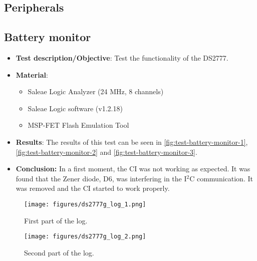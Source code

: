 \subsection{Peripherals}

\subsection{Battery monitor}

\begin{itemize}
    \item \textbf{Test description/Objective}: Test the functionality of the DS2777.
    \item \textbf{Material}:
        \begin{itemize}
            \item Saleae Logic Analyzer (24 MHz, 8 channels)
            \item Saleae Logic software (v1.2.18)
            \item MSP-FET Flash Emulation Tool
        \end{itemize}
    \item \textbf{Results}: The results of this test can be seen in \autoref{fig:test-battery-monitor-1}, \autoref{fig:test-battery-monitor-2} and \autoref{fig:test-battery-monitor-3}.
    \item \textbf{Conclusion:} In a first moment, the CI was not working as expected. It was found that the Zener diode, D6, was interfering in the I$^{2}$C communication. It was removed and the CI started to work properly.  
\end{itemize}

\begin{figure}[!ht]
    \begin{center}
        \texttt{[image: figures/ds2777g\_log\_1.png]}
        \caption{First part of the log.}
        \label{fig:test-battery-monitor-1}
    \end{center}
\end{figure}

\begin{figure}[!ht]
    \begin{center}
        \texttt{[image: figures/ds2777g\_log\_2.png]}
        \caption{Second part of the log.}
        \label{fig:test-battery-monitor-2}
    \end{center}
\end{figure}

\newpage

